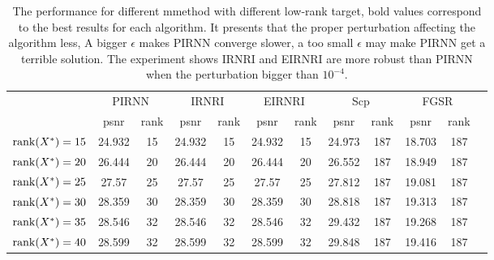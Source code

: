 \documentclass[twoside,11pt]{article}
\numberwithin{equation}{section}
\begin{document}
\begin{table}[htbp]
  \begin{tabular}{lccccccccccc}
    \toprule
                        & \multicolumn{2}{c}{PIRNN} & \multicolumn{2}{c}{IRNRI} & \multicolumn{2}{c}{EIRNRI} & \multicolumn{2}{c}{Scp} & \multicolumn{2}{c}{FGSR} \\
                        & psnr         & rank       & psnr          & rank       & psnr          & rank       & psnr        & rank      & psnr         & rank      \\
    \hline
${\rm rank}(X^{*})=15$ & 24.932       & 15         & 24.932        & 15         & 24.932        & 15         & 24.973      & 187       & 18.703       & 187       \\
${\rm rank}(X^{*})=20$ & 26.444       & 20         & 26.444        & 20         & 26.444        & 20         & 26.552      & 187       & 18.949       & 187       \\
${\rm rank}(X^{*})=25$ & 27.57        & 25         & 27.57         & 25         & 27.57         & 25         & 27.812      & 187       & 19.081       & 187       \\
${\rm rank}(X^{*})=30$ & 28.359       & 30         & 28.359        & 30         & 28.359        & 30         & 28.818      & 187       & 19.313       & 187       \\
${\rm rank}(X^{*})=35$ & 28.546       & 32         & 28.546        & 32         & 28.546        & 32         & 29.432      & 187       & 19.268       & 187       \\
${\rm rank}(X^{*})=40$ & 28.599       & 32         & 28.599        & 32         & 28.599        & 32         & 29.848      & 187       & 19.416       & 187       \\
    \bottomrule
  \end{tabular}
  \captionsetup{singlelinecheck=off, justification=raggedright}
  \caption{The performance for different mmethod with different low-rank target, bold values correspond to the best results for each algorithm. It presents that the proper perturbation affecting the algorithm less, A bigger $\epsilon$ makes PIRNN converge slower, a too small $\epsilon$ may make PIRNN get a terrible solution. The experiment shows IRNRI and EIRNRI are more robust than PIRNN when the perturbation bigger than $10^{-4}$.}
  \label{tab_img_recovery}
  \end{table}

%
%
%
%
%
%
%
\end{document}

